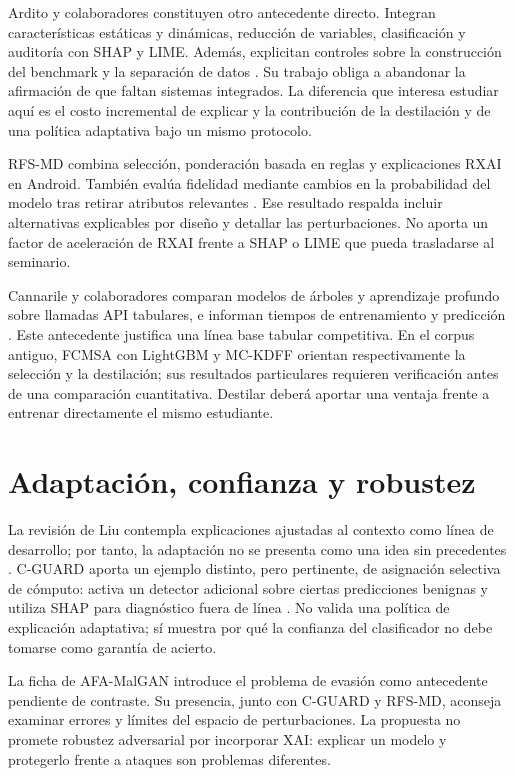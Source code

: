 Ardito y colaboradores constituyen otro antecedente directo. Integran características estáticas y dinámicas, reducción de variables, clasificación y auditoría con SHAP y LIME. Además, explicitan controles sobre la construcción del benchmark y la separación de datos \parencite{Ardito2026Hybrid}. Su trabajo obliga a abandonar la afirmación de que faltan sistemas integrados. La diferencia que interesa estudiar aquí es el costo incremental de explicar y la contribución de la destilación y de una política adaptativa bajo un mismo protocolo.

RFS-MD combina selección, ponderación basada en reglas y explicaciones RXAI en Android. También evalúa fidelidad mediante cambios en la probabilidad del modelo tras retirar atributos relevantes \parencite{Alhawari2026RFSMD}. Ese resultado respalda incluir alternativas explicables por diseño y detallar las perturbaciones. No aporta un factor de aceleración de RXAI frente a SHAP o LIME que pueda trasladarse al seminario.

Cannarile y colaboradores comparan modelos de árboles y aprendizaje profundo sobre llamadas API tabulares, e informan tiempos de entrenamiento y predicción \parencite{Cannarile2022API}. Este antecedente justifica una línea base tabular competitiva. En el corpus antiguo, FCMSA con LightGBM y MC-KDFF orientan respectivamente la selección y la destilación; sus resultados particulares requieren verificación antes de una comparación cuantitativa. Destilar deberá aportar una ventaja frente a entrenar directamente el mismo estudiante.

\section{Adaptación, confianza y robustez}
La revisión de Liu contempla explicaciones ajustadas al contexto como línea de desarrollo; por tanto, la adaptación no se presenta como una idea sin precedentes \parencite{Liu2025GlassBox}. C-GUARD aporta un ejemplo distinto, pero pertinente, de asignación selectiva de cómputo: activa un detector adicional sobre ciertas predicciones benignas y utiliza SHAP para diagnóstico fuera de línea \parencite{Imran2026CGUARD}. No valida una política de explicación adaptativa; sí muestra por qué la confianza del clasificador no debe tomarse como garantía de acierto.

La ficha de AFA-MalGAN introduce el problema de evasión como antecedente pendiente de contraste. Su presencia, junto con C-GUARD y RFS-MD, aconseja examinar errores y límites del espacio de perturbaciones. La propuesta no promete robustez adversarial por incorporar XAI: explicar un modelo y protegerlo frente a ataques son problemas diferentes.

